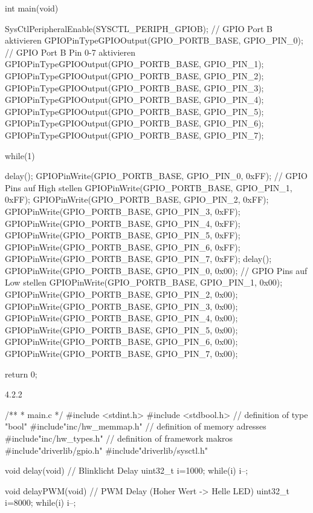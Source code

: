 int main(void){
    SysCtlPeripheralEnable(SYSCTL_PERIPH_GPIOB);                // GPIO Port B aktivieren
    GPIOPinTypeGPIOOutput(GPIO_PORTB_BASE, GPIO_PIN_0);         // GPIO Port B Pin 0-7 aktivieren
    GPIOPinTypeGPIOOutput(GPIO_PORTB_BASE, GPIO_PIN_1);
    GPIOPinTypeGPIOOutput(GPIO_PORTB_BASE, GPIO_PIN_2);
    GPIOPinTypeGPIOOutput(GPIO_PORTB_BASE, GPIO_PIN_3);
    GPIOPinTypeGPIOOutput(GPIO_PORTB_BASE, GPIO_PIN_4);
    GPIOPinTypeGPIOOutput(GPIO_PORTB_BASE, GPIO_PIN_5);
    GPIOPinTypeGPIOOutput(GPIO_PORTB_BASE, GPIO_PIN_6);
    GPIOPinTypeGPIOOutput(GPIO_PORTB_BASE, GPIO_PIN_7);

   while(1)
   {
       delay();
    GPIOPinWrite(GPIO_PORTB_BASE, GPIO_PIN_0, 0xFF);            // GPIO Pins auf High stellen
    GPIOPinWrite(GPIO_PORTB_BASE, GPIO_PIN_1, 0xFF);
    GPIOPinWrite(GPIO_PORTB_BASE, GPIO_PIN_2, 0xFF);
    GPIOPinWrite(GPIO_PORTB_BASE, GPIO_PIN_3, 0xFF);
    GPIOPinWrite(GPIO_PORTB_BASE, GPIO_PIN_4, 0xFF);
    GPIOPinWrite(GPIO_PORTB_BASE, GPIO_PIN_5, 0xFF);
    GPIOPinWrite(GPIO_PORTB_BASE, GPIO_PIN_6, 0xFF);
    GPIOPinWrite(GPIO_PORTB_BASE, GPIO_PIN_7, 0xFF);
        delay();
    GPIOPinWrite(GPIO_PORTB_BASE, GPIO_PIN_0, 0x00);            // GPIO Pins auf Low stellen
    GPIOPinWrite(GPIO_PORTB_BASE, GPIO_PIN_1, 0x00);
    GPIOPinWrite(GPIO_PORTB_BASE, GPIO_PIN_2, 0x00);
    GPIOPinWrite(GPIO_PORTB_BASE, GPIO_PIN_3, 0x00);
    GPIOPinWrite(GPIO_PORTB_BASE, GPIO_PIN_4, 0x00);
    GPIOPinWrite(GPIO_PORTB_BASE, GPIO_PIN_5, 0x00);
    GPIOPinWrite(GPIO_PORTB_BASE, GPIO_PIN_6, 0x00);
    GPIOPinWrite(GPIO_PORTB_BASE, GPIO_PIN_7, 0x00);

   }
    return 0;
}


4.2.2


/**
 * main.c
 */
 #include <stdint.h>
 #include <stdbool.h>                                           // definition of type "bool"
 #include"inc/hw_memmap.h"                                      // definition of memory adresses
#include"inc/hw_types.h"                                        // definition of framework makros
 #include"driverlib/gpio.h"
 #include"driverlib/sysctl.h"

void delay(void)                                                // Blinklicht Delay
{
  uint32_t i=1000;                                              
  while(i) {i--;}
 }

void delayPWM(void)                                             // PWM Delay (Hoher Wert -> Helle LED)
{
  uint32_t i=8000;                                            
  while(i) {i--;}
 }


